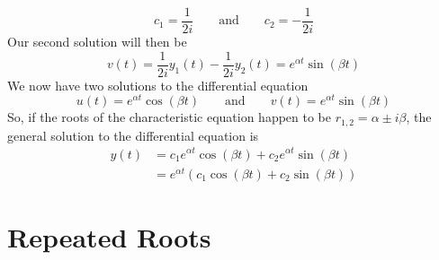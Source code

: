\documentclass[10pt,reqno]{book}
\theoremstyle{definition}
\begin{document}
	\[ c_1 = \frac{1}{2i} \qquad \text{and} \qquad c_2 = -\frac{1}{2i} \]
	Our second solution will then be
	\[ v(t) = \frac{1}{2i} y_1(t) - \frac{1}{2i} y_2(t) = e^{\alpha t} \sin(\beta t) \]
	We now have two solutions to the differential equation
	\[ u(t) = e^{\alpha t} \cos(\beta t) \qquad \text{and} \qquad v(t) = e^{\alpha t} \sin(\beta t)  \]
	So, if the roots of the characteristic equation happen to be $ r_{1,2} = \alpha \pm i \beta $, the general solution to the differential equation is
	\begin{align*}
		y(t) &= c_1 e^{\alpha t}\cos(\beta t) + c_2 e^{\alpha t}\sin(\beta t)\\
		&= e^{\alpha t}(c_1\cos(\beta t) + c_2\sin(\beta t))
	\end{align*}

	\section{Repeated Roots}
\end{document}
